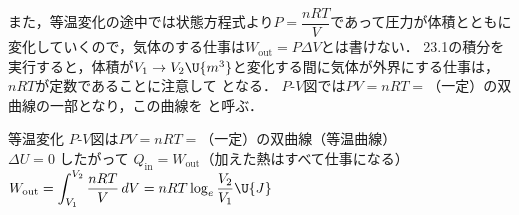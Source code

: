 また，等温変化の途中では状態方程式より$P=\dfrac{nRT}{V}$であって圧力が体積とともに変化していくので，気体のする仕事は$W_{\mathrm{out}}=P\Delta V$とは書けない．
23.1の積分を実行すると，体積が$V_1\rightarrow V_2\U{m^3}$と変化する間に気体が外界にする仕事は，$nRT$が定数であることに注意して
となる．
$P$-$V$図では$PV=nRT=$（一定）の双曲線の一部となり，この曲線を\,\,と呼ぶ．

\bsNeed{34mm}
\begin{matome}{等温変化}
 \hspace{3mm} $P$-$V$図は$PV=nRT=$（一定）の双曲線（{\gtfamily 等温曲線}）\\[1mm]
 \hspace{3mm} $\Delta U=0$\hspace{4mm} したがって\hspace{4mm} $Q_{\mathrm{in}}=W_{\mathrm{out}}$（加えた熱はすべて仕事になる）\\[1mm]
 \hspace{3mm} $W_{\mathrm{out}}=\displaystyle\int_{V_1}^{V_2}\frac{nRT}{V}\,dV=nRT\log_e\dfrac{V_2}{V_1}\U{J}$
\end{matome}

